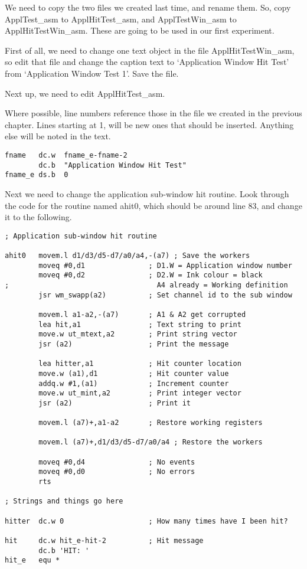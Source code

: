 We need to copy the two files we created last time, and rename them. So,
        copy ApplTest\_asm to ApplHitTest\_asm,
        and ApplTestWin\_asm to ApplHitTestWin\_asm. These are going to be used in our first
        experiment.

First of all, we need to change one text object in the file
 ApplHitTestWin\_asm, so edit that file and change the caption
        text to `Application Window Hit Test' from `Application Window Test 1'. Save the
        file.

Next up, we need to edit ApplHitTest\_asm. 

\begin{note}
Where possible, line numbers reference those in the file we created in the previous chapter. Lines starting at 1, will be new ones that should be inserted. Anything else will be noted in the text.
\end{note}

\begin{lstlisting}[firstnumber=5,caption={ApplTest\_asm - New Job Name}]
fname   dc.w  fname_e-fname-2
        dc.b  "Application Window Hit Test"
fname_e ds.b  0
\end{lstlisting}

Next we need to change the application sub-{}window hit routine. Look through
        the code for the routine named ahit0, which should be around line 83, and change it to the following.

\begin{lstlisting}[firstnumber=83,caption={ApplTest\_asm - New Application Window HIT Routine}]
; Application sub-window hit routine

ahit0   movem.l d1/d3/d5-d7/a0/a4,-(a7) ; Save the workers
        moveq #0,d1               ; D1.W = Application window number
        moveq #0,d2               ; D2.W = Ink colour = black
;                                   A4 already = Working definition
        jsr wm_swapp(a2)          ; Set channel id to the sub window

        movem.l a1-a2,-(a7)       ; A1 & A2 get corrupted
        lea hit,a1                ; Text string to print
        move.w ut_mtext,a2        ; Print string vector
        jsr (a2)                  ; Print the message

        lea hitter,a1             ; Hit counter location
        move.w (a1),d1            ; Hit counter value
        addq.w #1,(a1)            ; Increment counter
        move.w ut_mint,a2         ; Print integer vector
        jsr (a2)                  ; Print it

        movem.l (a7)+,a1-a2       ; Restore working registers

        movem.l (a7)+,d1/d3/d5-d7/a0/a4 ; Restore the workers

        moveq #0,d4               ; No events
        moveq #0,d0               ; No errors
        rts

; Strings and things go here

hitter  dc.w 0                    ; How many times have I been hit?

hit     dc.w hit_e-hit-2          ; Hit message
        dc.b 'HIT: '
hit_e   equ *
\end{lstlisting}

